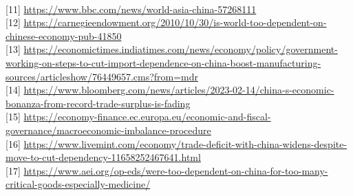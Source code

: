 \documentclass{article}
\begin{document}
\\
\hypertarget{link11}{[11] \href{https://www.bbc.com/news/world-asia-china-57268111}{https://www.bbc.com/news/world-asia-china-57268111}}
\\
\hypertarget{link12}{[12] \href{https://carnegieendowment.org/2010/10/30/is-world-too-dependent-on-chinese-economy-pub-41850}{https://carnegieendowment.org/2010/10/30/is-world-too-dependent-on-chinese-economy-pub-41850}}
\\
\hypertarget{link13}{[13] \href{https://economictimes.indiatimes.com/news/economy/policy/government-working-on-steps-to-cut-import-dependence-on-china-boost-manufacturing-sources/articleshow/76449657.cms?from=mdr}{https://economictimes.indiatimes.com/news/economy/policy/government-working-on-steps-to-cut-import-dependence-on-china-boost-manufacturing-sources/articleshow/76449657.cms?from=mdr}}
\\
\hypertarget{link14}{[14] \href{https://www.bloomberg.com/news/articles/2023-02-14/china-s-economic-bonanza-from-record-trade-surplus-is-fading}{https://www.bloomberg.com/news/articles/2023-02-14/china-s-economic-bonanza-from-record-trade-surplus-is-fading}}
\\
\hypertarget{link15}{[15] \href{https://economy-finance.ec.europa.eu/economic-and-fiscal-governance/macroeconomic-imbalance-procedure_en}{ https://economy-finance.ec.europa.eu/economic-and-fiscal-governance/macroeconomic-imbalance-procedure}}
\\
\hypertarget{link16}{[16] \href{ https://www.livemint.com/economy/trade-deficit-with-china-widens-despite-move-to-cut-dependency-11658252467641.html}{ https://www.livemint.com/economy/trade-deficit-with-china-widens-despite-move-to-cut-dependency-11658252467641.html}}
\\
\hypertarget{link17}{[17] \href{ https://www.aei.org/op-eds/were-too-dependent-on-china-for-too-many-critical-goods-especially-medicine/}{ https://www.aei.org/op-eds/were-too-dependent-on-china-for-too-many-critical-goods-especially-medicine/}}
\\
\end{document}
